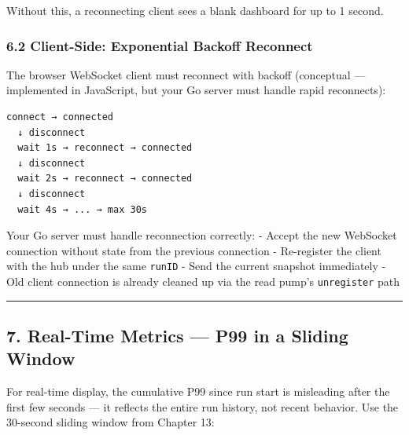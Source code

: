 \documentclass[
]{article}
\begin{document}
Without this, a reconnecting client sees a blank dashboard for up to 1
second.

\hypertarget{client-side-exponential-backoff-reconnect}{%
\subsubsection{6.2 Client-Side: Exponential Backoff
Reconnect}\label{client-side-exponential-backoff-reconnect}}

The browser WebSocket client must reconnect with backoff (conceptual ---
implemented in JavaScript, but your Go server must handle rapid
reconnects):

\begin{verbatim}
connect → connected
  ↓ disconnect
  wait 1s → reconnect → connected
  ↓ disconnect
  wait 2s → reconnect → connected
  ↓ disconnect
  wait 4s → ... → max 30s
\end{verbatim}

Your Go server must handle reconnection correctly: - Accept the new
WebSocket connection without state from the previous connection -
Re-register the client with the hub under the same \texttt{runID} - Send
the current snapshot immediately - Old client connection is already
cleaned up via the read pump's \texttt{unregister} path

\begin{center}\rule{0.5\linewidth}{0.5pt}\end{center}

\hypertarget{real-time-metrics-p99-in-a-sliding-window}{%
\subsection{7. Real-Time Metrics --- P99 in a Sliding
Window}\label{real-time-metrics-p99-in-a-sliding-window}}

For real-time display, the cumulative P99 since run start is misleading
after the first few seconds --- it reflects the entire run history, not
recent behavior. Use the 30-second sliding window from Chapter 13:
\end{document}
